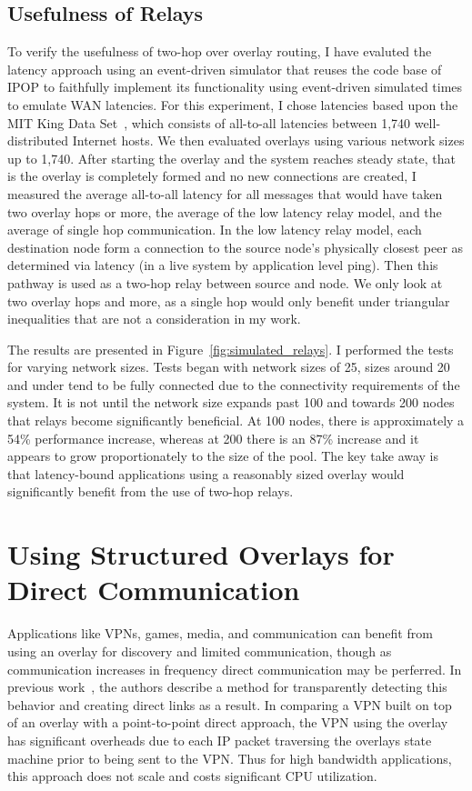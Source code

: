 \subsection{Usefulness of Relays}
To verify the usefulness of two-hop over overlay routing, I have evaluted
the latency approach using an event-driven simulator that reuses the code
base of IPOP to faithfully implement its functionality using event-driven
simulated times to emulate WAN latencies.  For this experiment, I chose
latencies based upon the MIT King Data Set~\cite{king_data}, which consists of
all-to-all latencies between 1,740 well-distributed Internet hosts.  We
then evaluated overlays using various network sizes up to 1,740.  After
starting the overlay and the system reaches steady state, that is the overlay
is completely formed and no new connections are created, I measured
the average all-to-all latency for all messages that would have taken two
overlay hops or more, the average of the low latency relay model, and the
average of single hop communication.  In the low latency relay model, each
destination node form a connection to the source node's physically closest peer
as determined via latency (in a live system by application level ping).  Then
this pathway is used as a two-hop relay between source and node.  We only look
at two overlay hops and more, as a single hop would only benefit under
triangular inequalities that are not a consideration in my work.  

The results are presented in Figure~\ref{fig:simulated_relays}.  I performed
the tests for varying network sizes.  Tests began with network sizes of 25, 
sizes around 20 and under tend to be fully connected due to the connectivity
requirements of the system.  It is not until the network size expands past 100
and towards 200 nodes that relays become significantly beneficial.  At
100 nodes, there is approximately a 54\% performance increase, whereas at
200 there is an 87\% increase and it appears to grow proportionately to the size
of the pool.  The key take away is that latency-bound applications
using a reasonably sized overlay would significantly benefit from
the use of two-hop relays.

\section{Using Structured Overlays for Direct Communication}
Applications like VPNs, games, media, and communication can benefit from using
an overlay for discovery and limited communication, though as communication
increases in frequency direct communication may be perferred.  In previous
work~\cite{wow}, the authors describe a method for transparently detecting this
behavior and creating direct links as a result.  In comparing a VPN built on
top of an overlay with a point-to-point direct approach, the VPN using the
overlay has significant overheads due to each IP packet traversing the overlays
state machine prior to being sent to the VPN.  Thus for high bandwidth
applications, this approach does not scale and costs significant CPU
utilization.

